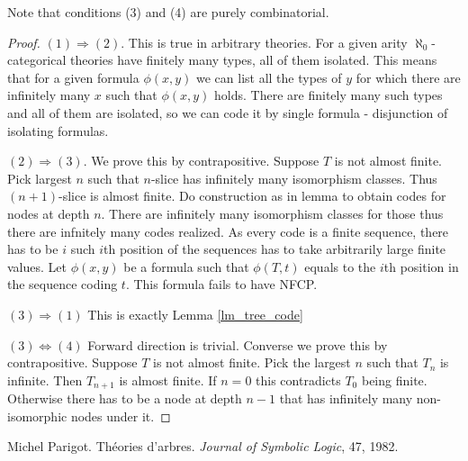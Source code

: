 \documentclass{amsart}
\begin{document}
Note that conditions (3) and (4) are purely combinatorial.

\begin{proof}
	$(1) \Rightarrow (2)$. This is true in arbitrary theories. For a given arity $\aleph_0$-categorical theories have finitely many types, all of them isolated. This means that for a given formula $\phi(x, y)$ we can list all the types of $y$ for which there are infinitely many $x$ such that $\phi(x, y)$ holds. There are finitely many such types and all of them are isolated, so we can code it by single formula - disjunction of isolating formulas.
	
	$(2) \Rightarrow (3)$. We prove this by contrapositive. Suppose $T$ is not almost finite. Pick largest $n$ such that $n$-slice has infinitely many isomorphism classes. Thus $(n+1)$-slice is almost finite. Do construction as in lemma to obtain codes for nodes at depth $n$. There are infinitely many isomorphism classes for those thus there are infnitely many codes realized. As every code is a finite sequence, there has to be $i$ such $i$th position of the sequences has to take arbitrarily large finite values. Let $\phi(x,y)$ be a formula such that $\phi(T, t)$ equals to the $i$th position in the sequence coding $t$. This formula fails to have NFCP.
	
	$(3) \Rightarrow (1)$ This is exactly Lemma \ref{lm_tree_code} %
	
	$(3) \Leftrightarrow (4)$ Forward direction is trivial. Converse we prove this by contrapositive. Suppose $T$ is not almost finite. Pick the largest $n$ such that $T_n$ is infinite. Then $T_{n+1}$ is almost finite. If $n=0$ this contradicts $T_0$ being finite. Otherwise there has to be a node at depth $n-1$ that has infinitely many non-isomorphic nodes under it. 
\end{proof}

\begin{thebibliography}{9}

	Michel Parigot.
	Th\'eories d'arbres.
	\textit{Journal of Symbolic Logic}, 47, 1982.
	
\end{thebibliography}
\end{document}
